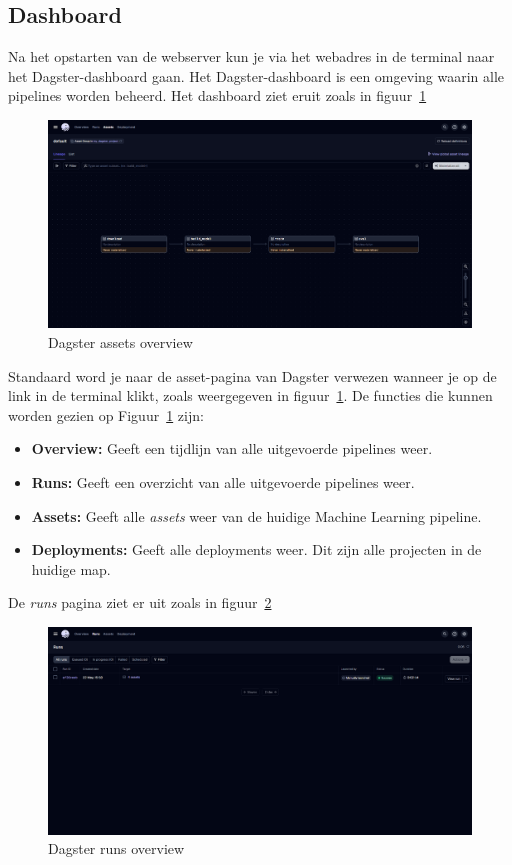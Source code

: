 \subsection{Dashboard}
Na het opstarten van de webserver kun je via het webadres in de terminal naar het Dagster-dashboard gaan. Het Dagster-dashboard is een omgeving waarin alle pipelines worden beheerd.
Het dashboard ziet eruit zoals in figuur~\ref{fig:Dagser_assets}
\begin{figure}[h]
    \centering
    \includegraphics[width=0.9\linewidth]{graphics/Dagster_Assets.PNG}
    \caption{Dagster assets overview}
    \label{fig:Dagser_assets}
\end{figure}
Standaard word je naar de asset-pagina van Dagster verwezen wanneer je op de link in de terminal klikt, zoals weergegeven in figuur~\ref{fig:Dagser_assets}.
De functies die kunnen worden gezien op Figuur~\ref{fig:Dagser_assets} zijn:

\begin{itemize}
    \item \textbf{Overview:} Geeft een tijdlijn van alle uitgevoerde pipelines weer.
    \item \textbf{Runs:} Geeft een overzicht van alle uitgevoerde pipelines weer.
    \item \textbf{Assets:} Geeft alle \textit{assets} weer van de huidige Machine Learning pipeline.
    \item \textbf{Deployments:} Geeft alle deployments weer. Dit zijn alle projecten in de huidige map.
\end{itemize}

De \textit{runs} pagina ziet er uit zoals in figuur~\ref{fig:Dagser_runs}
\begin{figure}[h]
    \centering
    \includegraphics[width=0.9\linewidth]{graphics/Dagster_Runs.PNG}
    \caption{Dagster runs overview}
    \label{fig:Dagser_runs}
\end{figure}

